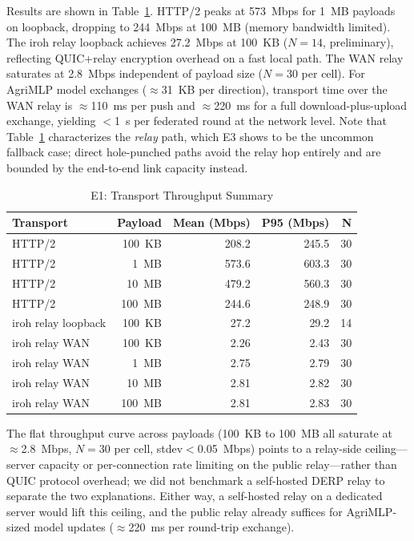 \documentclass[a4paper,fleqn]{cas-dc}
\begin{document}
Results are shown in Table~\ref{tab:e1}. HTTP/2 peaks at 573~Mbps for 1~MB payloads on loopback, dropping to 244~Mbps at 100~MB (memory bandwidth limited). The iroh relay loopback achieves 27.2~Mbps at 100~KB ($N{=}14$, preliminary), reflecting QUIC+relay encryption overhead on a fast local path. The WAN relay saturates at 2.8~Mbps independent of payload size ($N{=}30$ per cell). For AgriMLP model exchanges ($\approx$31~KB per direction), transport time over the WAN relay is $\approx$110~ms per push and $\approx$220~ms for a full download-plus-upload exchange, yielding $<$1~s per federated round at the network level. Note that Table~\ref{tab:e1} characterizes the \emph{relay} path, which E3 shows to be the uncommon fallback case; direct hole-punched paths avoid the relay hop entirely and are bounded by the end-to-end link capacity instead.

\begin{table}[t]
\centering
\caption{E1: Transport Throughput Summary}
\label{tab:e1}
\scriptsize
\setlength{\tabcolsep}{3.5pt}
\begin{tabular}{l r r r r}
\toprule
\textbf{Transport} & \textbf{Payload} & \textbf{Mean (Mbps)} & \textbf{P95 (Mbps)} & \textbf{N} \\
\midrule
HTTP/2               & 100~KB  & 208.2  & 245.5  & 30 \\
HTTP/2               & 1~MB    & 573.6  & 603.3  & 30 \\
HTTP/2               & 10~MB   & 479.2  & 560.3  & 30 \\
HTTP/2               & 100~MB  & 244.6  & 248.9  & 30 \\
\midrule
iroh relay loopback  & 100~KB  & 27.2   & 29.2   & 14 \\
\midrule
iroh relay WAN       & 100~KB  & 2.26   & 2.43   & 30 \\
iroh relay WAN       & 1~MB    & 2.75   & 2.79   & 30 \\
iroh relay WAN       & 10~MB   & 2.81   & 2.82   & 30 \\
iroh relay WAN       & 100~MB  & 2.81   & 2.83   & 30 \\
\bottomrule
\end{tabular}
\end{table}

The flat throughput curve across payloads (100~KB to 100~MB all saturate at $\approx$2.8~Mbps, $N{=}30$ per cell, stdev${<}$0.05~Mbps) points to a relay-side ceiling---server capacity or per-connection rate limiting on the public relay---rather than QUIC protocol overhead; we did not benchmark a self-hosted DERP relay to separate the two explanations. Either way, a self-hosted relay on a dedicated server would lift this ceiling, and the public relay already suffices for AgriMLP-sized model updates ($\approx$220~ms per round-trip exchange).
\end{document}
